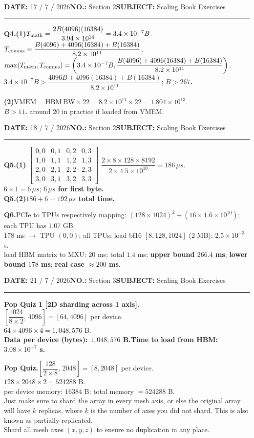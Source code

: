 \documentclass[10pt]{article}
\newcommand{\note}[1]{\textcolor{blue!55!black}{#1}}
\newcommand{\answer}[1]{\textcolor{blue!65!black}{\textbf{#1}}}
\newcommand{\question}[1]{\par\vspace{0.9em}\noindent\textbf{#1}\quad}
\newcommand{\meta}[2]{\textbf{#1} #2\hspace{2.5em}}
\newcommand{\pagehead}[2]{%
 {\small\meta{DATE:}{#1}\meta{NO.:}{#2}\meta{SUBJECT:}{Scaling Book Exercises}}\par\vspace{0.8em}\hrule\vspace{0.8em}}
\begin{document}
\newpage
\pagehead{17 / 7 / 2026}{Section 2}
\question{Q4.(1)}$T_{\rm math}=\dfrac{2B(4096)(16384)}{3.94\times10^{14}}=3.4\times10^{-7}B$.\\
$T_{\rm comms}=\dfrac{B(4096)+4096(16384)+B(16384)}{8.2\times10^{11}}$.\\
$\max(T_{\rm math},T_{\rm comms})=\left(3.4\times10^{-7}B,\dfrac{B(4096)+4096(16384)+B(16384)}{8.2\times10^{11}}\right)$.\\
$3.4\times10^{-7}B>\dfrac{4096B+4096(16384)+B(16384)}{8.2\times10^{11}}$; \answer{$B>267$.}

\textbf{(2)}\quad $\mathrm{VMEM}=\mathrm{HBM\ BW}\times22=8.2\times10^{11}\times22=1.804\times10^{13}$.\\
\answer{$B>11$.} \quad \note{around 20 in practice if loaded from VMEM.}

\newpage
\pagehead{18 / 7 / 2026}{Section 2}
\question{Q5.(1)}
$\begin{bmatrix}0,0&0,1&0,2&0,3\\1,0&1,1&1,2&1,3\\2,0&2,1&2,2&2,3\\3,0&3,1&3,2&3,3\end{bmatrix}$\quad
$\dfrac{2\times8\times128\times8192}{2\times4.5\times10^{10}}=186\,\mu s$.\\
$6\times1=6\,\mu s$; \answer{$6\,\mu s$ for first byte.}\\
\textbf{Q5.(2)}\quad \answer{$186+6=192\,\mu s$ total time.}

\question{Q6.}PCIe to TPUs respectively mapping: $(128\times1024)^2\div(16\times1.6\times10^{10})$; each TPU has $1.07$ GB.\\
$178$ ms $\rightarrow$ TPU $(0,0)$; all TPUs; load bf16 $[8,128,1024]$ ($2$ MB); $2.5\times10^{-3}$ s.\\
load HBM matrix to MXU: $20$ ms; total $1.4$ ms; \answer{upper bound $266.4$ ms}; \answer{lower bound $178$ ms}; \answer{real case $\approx200$ ms.}

\newpage
\pagehead{21 / 7 / 2026}{Section 3}
\question{Pop Quiz 1 [2D sharding across 1 axis].}\\
$\left[\dfrac{1024}{8\times2},\,4096\right]=[64,4096]$ per device.\\
$64\times4096\times4=1{,}048{,}576$ B.\\
\answer{Data per device (bytes): $1{,}048{,}576$ B.}\quad \answer{Time to load from HBM: $3.08\times10^{-7}$ s.}

\question{Pop Quiz.}$\left[\dfrac{128}{2\times8},\,2048\right]=[8,2048]$ per device.\\
$128\times2048\times2=524288$ B.\\
per device memory: $16384$ B; total memory $=524288$ B.\\
\note{Just make sure to shard the array in every mesh axis, or else the original array will have $k$ replicas, where $k$ is the number of axes you did not shard. This is also known as partially-replicated.}\\
\note{Shard all mesh axes $(x,y,z)$ to ensure no duplication in any place.}
\end{document}
